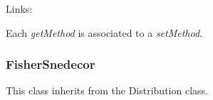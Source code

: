 \begin{description}
\begin{description}
\end{description}

\item[Links:]  \rule{0pt}{1em}
\end{description}

Each  \textit{getMethod}  is associated to a \textit{setMethod}.

\newpage
\subsubsection{FisherSnedecor}


This class inherits from the Distribution class.

